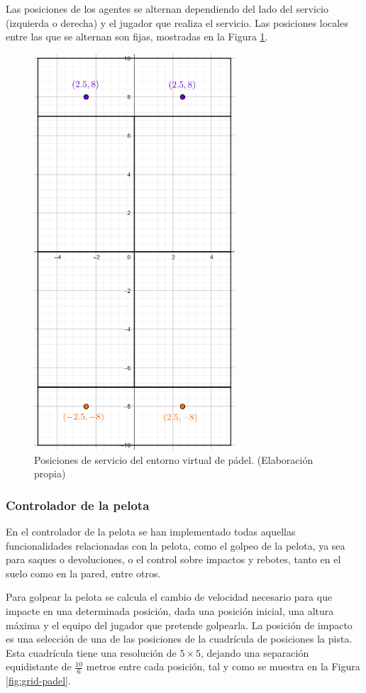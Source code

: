 Las posiciones de los agentes se alternan dependiendo del lado del servicio (izquierda o derecha) y el jugador que realiza el servicio. Las posiciones locales entre las que se alternan son fijas, mostradas en la Figura \ref{fig:serve-positions}.
\begin{figure}[H]
    \centering
    \includegraphics[width=7.5cm]{figures/serve-positions.png}
    \caption[Posiciones de servicio del entorno virtual de pádel]{Posiciones de servicio del entorno virtual de pádel. (Elaboración propia)}
    \label{fig:serve-positions}
\end{figure}

\subsubsection{Controlador de la pelota}

En el controlador de la pelota se han implementado todas aquellas funcionalidades relacionadas con la pelota, como el golpeo de la pelota, ya sea para saques o devoluciones, o el control sobre impactos y rebotes, tanto en el suelo como en la pared, entre otros.

Para golpear la pelota se calcula el cambio de velocidad necesario para que impacte en una determinada posición, dada una posición inicial, una altura máxima y el equipo del jugador que pretende golpearla. La posición de impacto es una selección de una de las posiciones de la cuadrícula de posiciones la pista. Esta cuadrícula tiene una resolución de $5\times5$, dejando una separación equidistante de $\frac{10}{6}$ metros entre cada posición, tal y como se muestra en la Figura \ref{fig:grid-padel}. 

